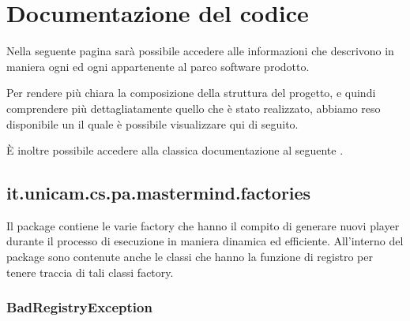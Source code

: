 \documentclass[letterpaper,10pt,italian,openany,oneside]{sphinxmanual}
\begin{document}
\chapter{Documentazione del codice}
\label{\detokenize{source/packages:documentazione-del-codice}}\label{\detokenize{source/packages::doc}}
Nella seguente pagina sarà possibile accedere alle informazioni che descrivono in maniera  ogni
 ed ogni  appartenente al parco software prodotto.

Per rendere più chiara la composizione della struttura del progetto, e quindi comprendere più dettagliatamente quello
che è stato realizzato, abbiamo reso disponibile un  il quale è possibile visualizzare qui di seguito.

\noindent{}

È inoltre possibile accedere alla classica documentazione  al seguente .


\section{it.unicam.cs.pa.mastermind.factories}
\label{\detokenize{source/it/unicam/cs/pa/mastermind/factories/package-index:it-unicam-cs-pa-mastermind-factories}}\label{\detokenize{source/it/unicam/cs/pa/mastermind/factories/package-index::doc}}
Il package contiene le varie factory che hanno il compito di generare nuovi player durante il processo di esecuzione in maniera dinamica ed efficiente. All’interno del package sono contenute anche le classi che hanno la funzione di registro per tenere traccia di tali classi factory.

\label{\detokenize{source/it/unicam/cs/pa/mastermind/factories/package-index:package-it.unicam.cs.pa.mastermind.factories}}

\subsection{BadRegistryException}
\label{\detokenize{source/it/unicam/cs/pa/mastermind/factories/BadRegistryException:badregistryexception}}\label{\detokenize{source/it/unicam/cs/pa/mastermind/factories/BadRegistryException::doc}}
\end{document}
